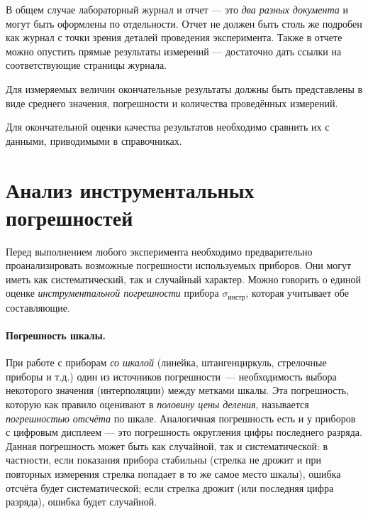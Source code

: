В общем случае лабораторный журнал и отчет --- это \emph{два разных документа} и
могут быть оформлены по отдельности. Отчет не должен быть столь же подробен
как журнал с точки зрения деталей проведения эксперимента.
Также в отчете можно опустить прямые результаты измерений ---
достаточно дать ссылки на соответствующие страницы журнала.

Для измеряемых величин окончательные результаты должны быть представлены
в виде среднего значения, погрешности и количества проведённых измерений.

Для окончательной оценки качества результатов необходимо
сравнить их с данными, приводимыми в справочниках.


\section{Анализ инструментальных погрешностей}

Перед выполнением любого эксперимента необходимо предварительно проанализировать
возможные погрешности используемых приборов. Они могут
иметь как систематический, так и случайный характер. Можно говорить
о единой оценке \emph{инструментальной погрешности} прибора
$\sigma_{\text{инстр}}$, которая учитывает обе составляющие.

\paragraph{Погрешность шкалы.}
При работе с приборам \emph{со шкалой} (линейка, штангенциркуль, стрелочные
приборы и т.д.) один из источников погрешности~--- необходимость
выбора некоторого значения (интерполяции) между метками шкалы. Эта
погрешность, которую как правило оценивают в \emph{половину цены деления},
называется \emph{погрешностью отсчёта} по шкале. Аналогичная погрешность
есть и у приборов с цифровым дисплеем --- это погрешность
округления цифры последнего разряда. Данная погрешность может быть
как случайной, так и систематической: в частности, если показания
прибора стабильны (стрелка не дрожит и при повторных измерения стрелка
попадает в то же самое место шкалы), ошибка отсчёта будет систематической;
если стрелка дрожит (или  последняя цифра разряда),
ошибка будет случайной.

